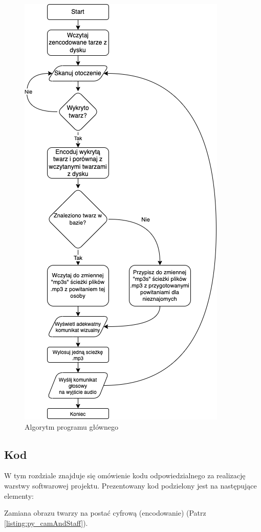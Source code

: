 \documentclass[a4paper,12pt,reqno]{article}
\begin{document}
\begin{figure}[H]%
\centering
\includegraphics[width=0.7\columnwidth]{imgs/glowny.drawio.png}
\caption{Algorytm programu głównego \cite{img_by_me} \label{algorytm_start_recognition}}
\quad
\end{figure}

\subsection{Kod}
W tym rozdziale znajduje się omówienie kodu odpowiedzialnego za realizację warstwy softwarowej projektu.
Prezentowany kod podzielony jest na następujące elementy:\newline

Zamiana obrazu twarzy na postać cyfrową (encodowanie) (Patrz \ref{listing:py_camAndStaff}).
\end{document}
